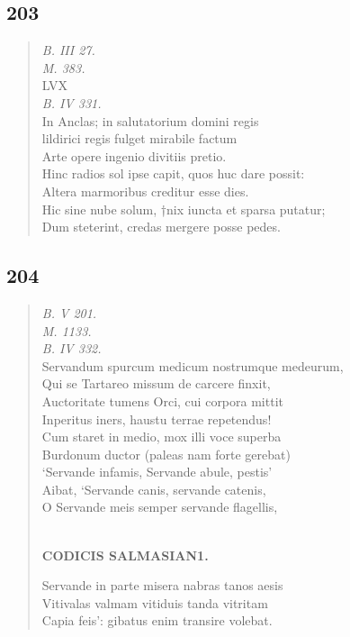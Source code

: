\documentclass[11pt, a4paper]{report}
\begin{document}
            \subsection*{203}
      \begin{verse}
      \textit{B. III 27.} \\ \textit{M. 383.} \\ LVX \\ \textit{B. IV 331.} \\ In Anclas; in salutatorium domini regis \\ lildirici regis fulget mirabile factum \\ Arte opere ingenio divitiis pretio. \\ Hinc radios sol ipse capit, quos huc dare possit: \\ Altera marmoribus creditur esse dies. \\ Hic sine nube solum, †nix iuncta et sparsa putatur; \\ Dum steterint, credas mergere posse pedes. \\ 
      \end{verse}
  
            \subsection*{204}
      \begin{verse}
      \textit{B. V 201.} \\ \textit{M. 1133.} \\ \textit{B. IV 332.} \\ Servandum spurcum medicum nostrumque medeurum, \\ Qui se Tartareo missum de carcere finxit, \\ Auctoritate tumens Orci, cui corpora mittit \\ Inperitus iners, haustu terrae repetendus! \\ Cum staret in medio, mox illi voce superba \\ Burdonum ductor (paleas nam forte gerebat) \\ ‘Servande infamis, Servande abule, pestis’ \\ Aibat, ‘Servande canis, servande catenis, \\  \lbrack O Servande meis semper servande flagellis, \\ 
        ﻿\pagebreak 
    \begin{center} \textbf{CODICIS SALMASIAN1.} \end{center} \marginpar{[177]} Servande in parte misera nabras tanos aesis \\ Vitivalas valmam vitiduis tanda vitritam \\ Capia feis’: gibatus enim transire volebat. \\ 
      \end{verse}
  
\end{document}
